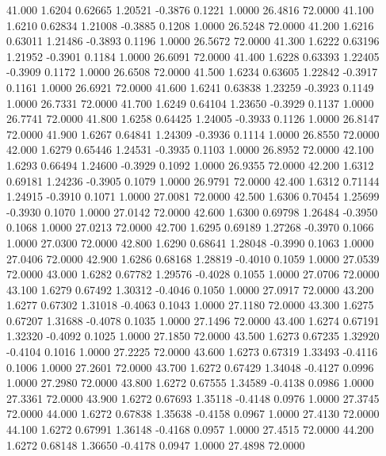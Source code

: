   41.000   1.6204   0.62665   1.20521  -0.3876   0.1221   1.0000  26.4816  72.0000
  41.100   1.6210   0.62834   1.21008  -0.3885   0.1208   1.0000  26.5248  72.0000
  41.200   1.6216   0.63011   1.21486  -0.3893   0.1196   1.0000  26.5672  72.0000
  41.300   1.6222   0.63196   1.21952  -0.3901   0.1184   1.0000  26.6091  72.0000
  41.400   1.6228   0.63393   1.22405  -0.3909   0.1172   1.0000  26.6508  72.0000
  41.500   1.6234   0.63605   1.22842  -0.3917   0.1161   1.0000  26.6921  72.0000
  41.600   1.6241   0.63838   1.23259  -0.3923   0.1149   1.0000  26.7331  72.0000
  41.700   1.6249   0.64104   1.23650  -0.3929   0.1137   1.0000  26.7741  72.0000
  41.800   1.6258   0.64425   1.24005  -0.3933   0.1126   1.0000  26.8147  72.0000
  41.900   1.6267   0.64841   1.24309  -0.3936   0.1114   1.0000  26.8550  72.0000
  42.000   1.6279   0.65446   1.24531  -0.3935   0.1103   1.0000  26.8952  72.0000
  42.100   1.6293   0.66494   1.24600  -0.3929   0.1092   1.0000  26.9355  72.0000
  42.200   1.6312   0.69181   1.24236  -0.3905   0.1079   1.0000  26.9791  72.0000
  42.400   1.6312   0.71144   1.24915  -0.3910   0.1071   1.0000  27.0081  72.0000
  42.500   1.6306   0.70454   1.25699  -0.3930   0.1070   1.0000  27.0142  72.0000
  42.600   1.6300   0.69798   1.26484  -0.3950   0.1068   1.0000  27.0213  72.0000
  42.700   1.6295   0.69189   1.27268  -0.3970   0.1066   1.0000  27.0300  72.0000
  42.800   1.6290   0.68641   1.28048  -0.3990   0.1063   1.0000  27.0406  72.0000
  42.900   1.6286   0.68168   1.28819  -0.4010   0.1059   1.0000  27.0539  72.0000
  43.000   1.6282   0.67782   1.29576  -0.4028   0.1055   1.0000  27.0706  72.0000
  43.100   1.6279   0.67492   1.30312  -0.4046   0.1050   1.0000  27.0917  72.0000
  43.200   1.6277   0.67302   1.31018  -0.4063   0.1043   1.0000  27.1180  72.0000
  43.300   1.6275   0.67207   1.31688  -0.4078   0.1035   1.0000  27.1496  72.0000
  43.400   1.6274   0.67191   1.32320  -0.4092   0.1025   1.0000  27.1850  72.0000
  43.500   1.6273   0.67235   1.32920  -0.4104   0.1016   1.0000  27.2225  72.0000
  43.600   1.6273   0.67319   1.33493  -0.4116   0.1006   1.0000  27.2601  72.0000
  43.700   1.6272   0.67429   1.34048  -0.4127   0.0996   1.0000  27.2980  72.0000
  43.800   1.6272   0.67555   1.34589  -0.4138   0.0986   1.0000  27.3361  72.0000
  43.900   1.6272   0.67693   1.35118  -0.4148   0.0976   1.0000  27.3745  72.0000
  44.000   1.6272   0.67838   1.35638  -0.4158   0.0967   1.0000  27.4130  72.0000
  44.100   1.6272   0.67991   1.36148  -0.4168   0.0957   1.0000  27.4515  72.0000
  44.200   1.6272   0.68148   1.36650  -0.4178   0.0947   1.0000  27.4898  72.0000

